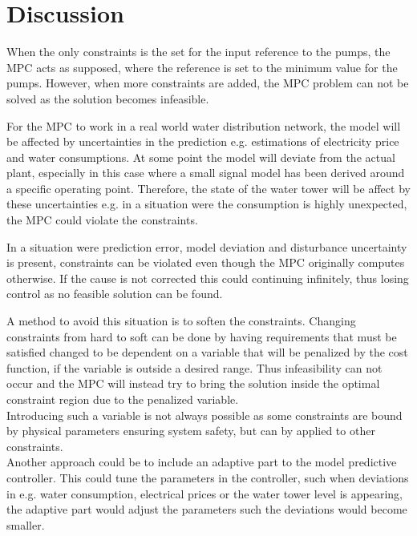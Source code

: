 \chapter{Discussion}
\label{Discussion}

When the only constraints is the set for the input reference to the pumps, the MPC acts as supposed, where the reference is set to the minimum value for the pumps. However, when more constraints are added, the MPC problem can not be solved as the solution becomes infeasible.  

For the MPC to work in a real world water distribution network, the model will be affected by uncertainties in the prediction e.g. estimations of electricity price and water consumptions. At some point the model will deviate from the actual plant, especially in this case where a small signal model has been derived around a specific operating point. Therefore, the state of the water tower will be affect by these uncertainties e.g. in a situation were the consumption is highly unexpected, the MPC could violate the constraints.

In a situation were prediction error, model deviation and disturbance uncertainty is present, constraints can be violated even though the MPC originally computes otherwise. If the cause is not corrected this could continuing infinitely, thus losing control as no feasible solution can be found. 

A method to avoid this situation is to soften the constraints. Changing constraints from hard to soft can be done by having requirements that must be satisfied changed to be dependent on a variable that will be penalized by the cost function, if the variable is outside a desired range. Thus infeasibility can not occur and the MPC will instead try to bring the solution inside the optimal constraint region due to the penalized variable.\\   
Introducing such a variable is not always possible as some constraints are bound by physical parameters ensuring system safety, but can by applied to other constraints.\\
Another approach could be to include an adaptive part to the model predictive controller. This could tune the parameters in the controller, such when deviations in e.g. water consumption, electrical prices or the water tower level is appearing, the adaptive part would adjust the parameters such the deviations would become smaller.





